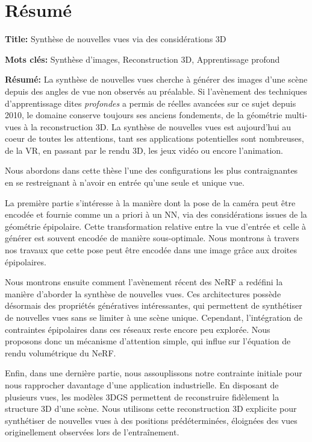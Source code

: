 \chapter{R\'esum\'e}

\begin{mdframed}[linecolor=Prune,linewidth=1]

    \textbf{Title:} Synthèse de nouvelles vues via des considérations 3D
    
    \noindent \textbf{Mots clés:} Synthèse d'images, Reconstruction 3D, Apprentissage profond
    
    \begin{multicols}{2}
    \noindent \textbf{Résumé:} La synthèse de nouvelles vues cherche à générer des images d'une scène depuis des angles de vue non observés au préalable. Si l'avènement des techniques d'apprentissage dites \textit{profondes} a permis de réelles avancées sur ce sujet depuis 2010, le domaine conserve toujours ses anciens fondements, de la géométrie multi-vues à la reconstruction 3D. La synthèse de nouvelles vues est aujourd'hui au coeur de toutes les attentions, tant ses applications potentielles sont nombreuses, de la \ac{VR}, en passant par le rendu 3D, les jeux vidéo ou encore l'animation.

Nous abordons dans cette thèse l'une des configurations les plus contraignantes en se restreignant à n'avoir en entrée qu'une seule et unique vue.

La première partie s'intéresse à la manière dont la pose de la caméra peut être encodée et fournie comme un a priori à un \ac{NN}, via des considérations issues de la géométrie épipolaire. Cette transformation relative entre la vue d'entrée et celle à générer est souvent encodée de manière sous-optimale. Nous montrons à travers nos travaux que cette pose peut être encodée dans une image grâce aux droites épipolaires.

Nous montrons ensuite comment l'avènement récent des \ac{NeRF} a redéfini la manière d'aborder la synthèse de nouvelles vues. Ces architectures possède désormais des propriétés génératives intéressantes, qui permettent de synthétiser de nouvelles vues sans se limiter à une scène unique. Cependant, l’intégration de contraintes épipolaires dans ces réseaux reste encore peu explorée. Nous proposons donc un mécanisme d’attention simple, qui influe sur l’équation de rendu volumétrique du \ac{NeRF}.

Enfin, dans une dernière partie, nous assouplissons notre contrainte initiale pour nous rapprocher davantage d'une application industrielle. En disposant de plusieurs vues, les modèles 3D\ac{GS} permettent de reconstruire fidèlement la structure 3D d'une scène. Nous utilisons cette reconstruction 3D explicite pour synthétiser de nouvelles vues à des positions prédéterminées, éloignées des vues originellement observées lors de l'entraînement. 
\end{multicols}

\end{mdframed}
